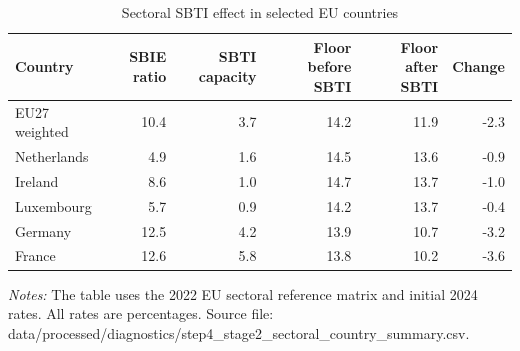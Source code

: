 \begin{table}[H]
\centering
\small
\caption[Sectoral SBTI effect in selected EU countries]{Sectoral SBTI effect in selected EU countries}
\label{tab:stage2_sectoral_sbti}
\begin{tabular}{@{}lrrrrr@{}}
\toprule
Country & SBIE ratio & SBTI capacity & Floor before SBTI & Floor after SBTI & Change \\
\midrule
EU27 weighted & 10.4 & 3.7 & 14.2 & 11.9 & -2.3 \\
Netherlands &  4.9 & 1.6 & 14.5 & 13.6 & -0.9 \\
Ireland &  8.6 & 1.0 & 14.7 & 13.7 & -1.0 \\
Luxembourg &  5.7 & 0.9 & 14.2 & 13.7 & -0.4 \\
Germany & 12.5 & 4.2 & 13.9 & 10.7 & -3.2 \\
France & 12.6 & 5.8 & 13.8 & 10.2 & -3.6 \\
\bottomrule
\end{tabular}

\vspace{0.5em}
\begin{minipage}{0.96\textwidth}
\footnotesize\raggedright \textit{Notes:} The table uses the 2022 EU sectoral reference matrix and initial 2024 rates. All rates are percentages. Source file: data/processed/diagnostics/step4\_stage2\_sectoral\_country\_summary.csv.
\end{minipage}
\end{table}
